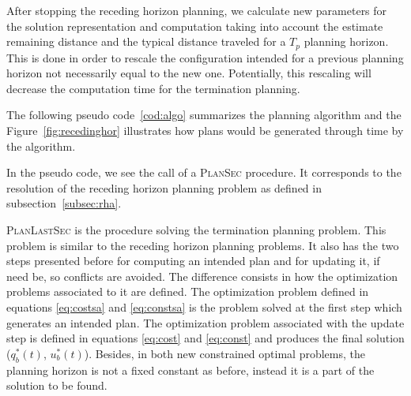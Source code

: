 \documentclass[eprint]{actapoly}
\begin{document}
After stopping the receding horizon planning, we calculate new parameters for 
the solution representation and computation taking into
account the estimate remaining distance and the typical distance traveled
for a $T_p$ planning horizon.
This is done in order to rescale the configuration intended for a previous 
planning horizon not necessarily equal to the new one. Potentially, this
rescaling will decrease the computation time for the termination planning.

The following pseudo code~\ref{cod:algo} summarizes the planning algorithm    
and the Figure~\ref{fig:recedinghor} illustrates how plans would be generated
through time by the algorithm.

In the pseudo code, we see the call of a {\scshape PlanSec} procedure.
It corresponds to the resolution of the receding horizon planning 
problem as defined in subsection~\ref{subsec:rha}.

{\scshape PlanLastSec} is the procedure solving the termination planning
problem. This problem is similar to the receding horizon planning problems.
It also has the two steps presented before for computing an intended plan and
for updating it, if need be, so conflicts are avoided.
The difference consists in how the optimization problems associated to it are 
defined. The optimization problem defined in equations \ref{eq:costsa} and
\ref{eq:constsa} is the problem solved at the first step which generates an
intended plan.
The optimization
problem associated with the update step is defined in equations 
\ref{eq:cost} and \ref{eq:const} and produces the final solution ($q^*_b(t)$, $u^*_b(t)$).
Besides, in both new constrained optimal problems, the planning horizon is not
a fixed constant as before, instead it is a part of the solution to be found.
\end{document}

